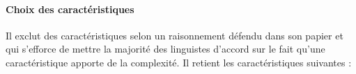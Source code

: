 \documentclass[a4paper, twoside]{article}
\begin{document}
    \paragraph{Choix des caractéristiques}

    Il exclut des caractéristiques selon un raisonnement défendu dans son papier et qui s’efforce de mettre la majorité des linguistes d’accord sur le fait qu’une caractéristique apporte de la complexité. Il retient les caractéristiques suivantes :

    
\end{document}

